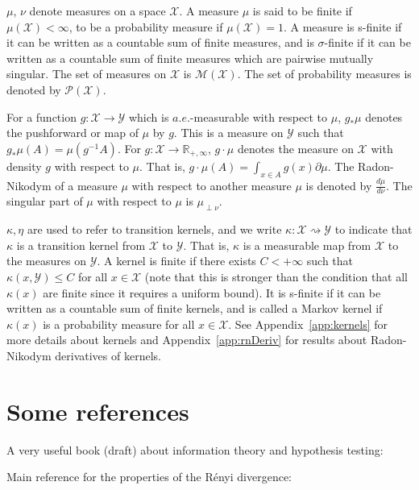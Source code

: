 $\mu$, $\nu$ denote measures on a space $\mathcal X$. A measure $\mu$ is said to be finite if $\mu(\mathcal X) < \infty$, to be a probability measure if $\mu(\mathcal X) = 1$. A measure is s-finite if it can be written as a countable sum of finite measures, and is $\sigma$-finite if it can be written as a countable sum of finite measures which are pairwise mutually singular.
The set of measures on $\mathcal X$ is $\mathcal M(\mathcal X)$. The set of probability measures is denoted by $\mathcal P(\mathcal X)$.

For a function $g : \mathcal X \to \mathcal Y$ which is $a.e.$-measurable with respect to $\mu$, $g_* \mu$ denotes the pushforward or map of $\mu$ by $g$. This is a measure on $\mathcal Y$ such that $g_* \mu (A) = \mu(g^{-1} A)$.
For $g : \mathcal X \to \mathbb{R}_{+,\infty}$, $g \cdot \mu$ denotes the measure on $\mathcal X$ with density $g$ with respect to $\mu$. That is, $g \cdot \mu (A) = \int_{x \in A} g(x) \partial\mu$.
The Radon-Nikodym of a measure $\mu$ with respect to another measure $\mu$ is denoted by $\frac{d\mu}{d\nu}$. The singular part of $\mu$ with respect to $\mu$ is $\mu_{\perp \nu}$.

$\kappa, \eta$ are used to refer to transition kernels, and we write $\kappa : \mathcal X \rightsquigarrow \mathcal Y$ to indicate that $\kappa$ is a transition kernel from $\mathcal X$ to $\mathcal Y$. That is, $\kappa$ is a measurable map from $\mathcal X$ to the measures on $\mathcal Y$.
A kernel is finite if there exists $C < + \infty$ such that $\kappa(x, \mathcal Y) \le C$ for all $x \in \mathcal X$ (note that this is stronger than the condition that all $\kappa(x)$ are finite since it requires a uniform bound). It is s-finite if it can be written as a countable sum of finite kernels, and is called a Markov kernel if $\kappa(x)$ is a probability measure for all $x \in \mathcal X$.
See Appendix~\ref{app:kernels} for more details about kernels and Appendix~\ref{app:rnDeriv} for results about Radon-Nikodym derivatives of kernels.



\section*{Some references}

A very useful book (draft) about information theory and hypothesis testing: \cite{polyanskiy2024information} 

Main reference for the properties of the Rényi divergence: \cite{van2014renyi}


